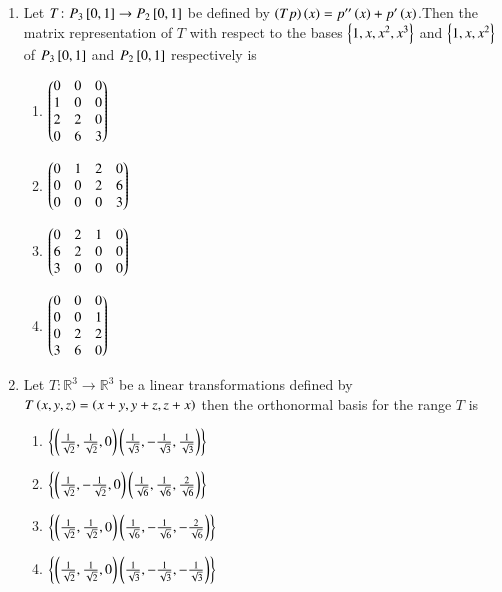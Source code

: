 \documentclass[journal,12pt,onecolumn]{IEEEtran}
\theoremstyle{remark}
\begin{document}
\begin{enumerate}
  \item Let $T \colon P_3{}\left[0,1\right] \rightarrow P_2{}\left[0,1\right]$ be defined by $\left(Tp\right)\left(x\right) = p^{\prime\prime}\left(x\right) + p^{\prime}\left(x\right)$.Then the matrix representation of $T$ with respect to the bases $\left\{1,x,x^2,x^3\right\}$ and $\left\{1,x,x^2\right\}$ of $P_3{}\left[0,1\right]$ and $P_2{}\left[0,1\right]$ respectively is
  \begin{multicols}{4}
      \begin{enumerate}
          \item $\begin{pmatrix}0 & 0 & 0 \\ 1 & 0 & 0 \\2 & 2 & 0\\0 & 6 & 3\end{pmatrix}$
          \item $\begin{pmatrix}0 & 1 & 2 & 0 \\ 0 & 0 & 2 & 6\\0 & 0 & 0 & 3\end{pmatrix}$
         \item $\begin{pmatrix}0 & 2& 1 & 0 \\ 6 & 2 & 0 & 0\\3 & 0 & 0 & 0\end{pmatrix}$
          \item $\begin{pmatrix}0 & 0 & 0 \\ 0 & 0 & 1 \\0 & 2 & 2\\3 & 6 & 0\end{pmatrix}$
      \end{enumerate}
  \end{multicols}
  \item Let $T \colon \mathbb{R}^3 \rightarrow \mathbb{R}^3$ be a linear transformations defined by  $T\left(x,y,z\right) = \left(x+y,y+z,z+x\right)$ then the orthonormal basis for the range $T$ is
  \begin{multicols}{2}
      \begin{enumerate}
          \item $\left\{\left(\frac{1}{\sqrt 2},\frac{1}{\sqrt 2},0\right)\left(\frac{1}{\sqrt 3},-\frac{1}{\sqrt 3},\frac{1}{\sqrt 3}\right)\right\}$
          \item $\left\{\left(\frac{1}{\sqrt 2},-\frac{1}{\sqrt 2},0\right)\left(\frac{1}{\sqrt 6},\frac{1}{\sqrt 6},\frac{2}{\sqrt 6}\right)\right\}$
              \item $\left\{\left(\frac{1}{\sqrt 2},\frac{1}{\sqrt 2},0\right)\left(\frac{1}{\sqrt 6},-\frac{1}{\sqrt 6},-\frac{2}{\sqrt 6}\right)\right\}$
          \item $\left\{\left(\frac{1}{\sqrt 2},\frac{1}{\sqrt 2},0\right)\left(\frac{1}{\sqrt 3},-\frac{1}{\sqrt 3},-\frac{1}{\sqrt 3}\right)\right\}$\\
      \end{enumerate}
  \end{multicols}

\end{enumerate}
\end{document}
